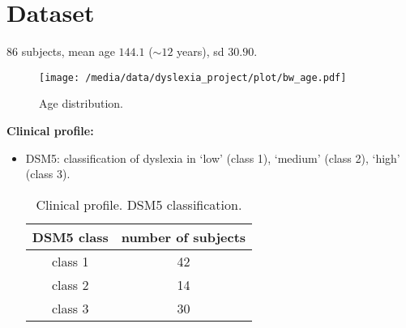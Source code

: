 \documentclass[11pt, a4paper, twoside, openright]{article}
\begin{document}
\section{Dataset}
$86$ subjects, mean age $144.1$ ($\sim 12$ years), sd $30.90$.
\begin{figure}[h!] 
\centering
\texttt{[image: /media/data/dyslexia\_project/plot/bw\_age.pdf]}
\caption{Age distribution.}
\label{fig:1}
\end{figure}

\textbf{Clinical profile:}\\
\begin{itemize}
\item DSM5: classification of dyslexia in `low' (class 1), `medium'
  (class 2), `high' (class 3).\\

\begin{table}[h!]
  \begin{center}
  \begin{tabular}{|c|c|}
    \hline
    DSM5 class & number of subjects\\
    \hline \hline
    class 1 & 42\\
    \hline
    class 2 & 14\\
    \hline
    class 3 & 30\\
    \hline
  \end{tabular}
\caption{Clinical profile. DSM5 classification.}
\label{tab:1}
\end{center}
\end{table}

\end{itemize}
\end{document}
